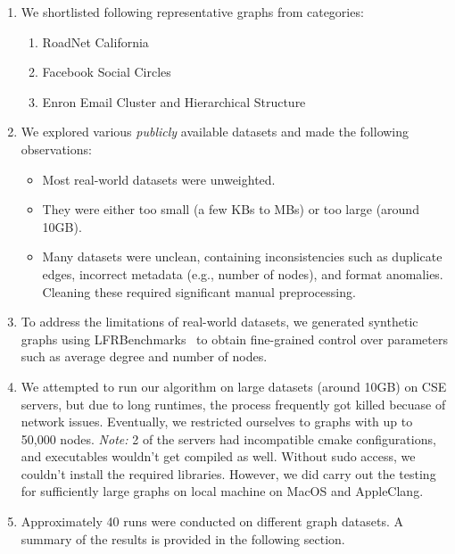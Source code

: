\documentclass{article}
\begin{document}
\begin{enumerate}
    \item We shortlisted following representative graphs from categories:
    \begin{enumerate}
        \item RoadNet California~\cite{roadnet}
        \item Facebook Social Circles~\cite{facebook}
        \item Enron Email Cluster and Hierarchical Structure~\cite{enron}
    \end{enumerate}

    \item We explored various \emph{publicly} available datasets and made the following observations:
    \begin{itemize}
        \item Most real-world datasets were unweighted.
        \item They were either too small (a few KBs to MBs) or too large (around 10GB).
        \item Many datasets were unclean, containing inconsistencies such as duplicate edges, incorrect metadata (e.g., number of nodes), and format anomalies. Cleaning these required significant manual preprocessing.
    \end{itemize}

    \item To address the limitations of real-world datasets, we generated synthetic graphs using LFRBenchmarks~\cite{lfrbench} to obtain fine-grained control over parameters such as average degree and number of nodes.

    \item We attempted to run our algorithm on large datasets (around 10GB) on CSE servers, but due to long runtimes, the process frequently got killed becuase of network issues. Eventually, we restricted ourselves to graphs with up to 50,000 nodes. \emph{Note:} 2 of the servers had incompatible cmake configurations, and executables wouldn't get compiled as well. Without sudo access, we couldn't install the required libraries. However, we did carry out the testing for sufficiently large graphs on local machine on MacOS and AppleClang.

    \item Approximately 40 runs were conducted on different graph datasets. A summary of the results is provided in the following section.
\end{enumerate}
\end{document}
